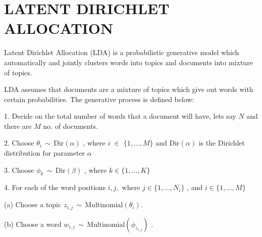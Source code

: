 \section{\uppercase{Latent Dirichlet Allocation}}
Latent Dirichlet Allocation (LDA) is a probabilistic generative model which automatically and jointly clusters words into topics and documents into mixture of topics.

LDA assumes that documents are a mixture of topics which give out words with certain probabilities. The generative process is defined below:

1. Decide on the total number of words that a document will have, lets say $N$ and there are $M$ no. of documents.

2. Choose  $\theta_i \, \sim \, \mathrm{Dir}(\alpha)$ , where  $i$ $\in$ $\{ 1,\dots,M \}$  and  $\mathrm{Dir}(\alpha)$  is the Dirichlet distribution for parameter $\alpha$

3. Choose  $\phi_k \, \sim \, \mathrm{Dir}(\beta)$ , where  $k \in \{ 1,\dots,K \}$ 

4. For each of the word positions $i, j,$ where  $j \in \{ 1,\dots,N_i \}$ , and  $i \in \{ 1,\dots,M \} $

(a) Choose a topic $z_{i,j} \,\sim\, \mathrm{Multinomial}(\theta_i)$. 

(b) Choose a word $w_{i,j} \,\sim\, \mathrm{Multinomial}( \phi_{z_{i,j}})$ .

